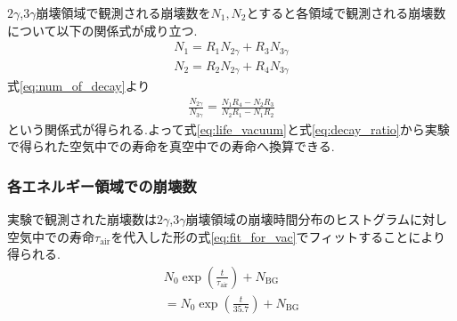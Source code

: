 $2\gamma$,$3\gamma$崩壊領域で観測される崩壊数を$N_1,N_2$とすると各領域で観測される崩壊数について以下の関係式が成り立つ.
\begin{align}
	N_1=R_1N_{2\gamma}+R_3N_{3\gamma} \\
	N_2=R_2N_{2\gamma}+R_4N_{3\gamma}
	\label{eq:num_of_decay}
\end{align}
式\ref{eq:num_of_decay}より
\begin{align}
	\frac{N_{2\gamma}}{N_{3\gamma}}=\frac{N_1R_4-N_2R_3}{N_2R_1-N_1R_2}
	\label{eq:decay_ratio}
\end{align}
という関係式が得られる.よって式\ref{eq:life_vacuum}と式\ref{eq:decay_ratio}から実験で得られた空気中での寿命を真空中での寿命へ換算できる.

\subsubsection{各エネルギー領域での崩壊数}
実験で観測された崩壊数は$2\gamma$,$3\gamma$崩壊領域の崩壊時間分布のヒストグラムに対し空気中での寿命$\tau_\textrm{air}$を代入した形の式\ref{eq:fit_for_vac}でフィットすることにより得られる.
\begin{align}
	N_0\exp\left(\frac{t}{\tau_\textrm{air}}\right)+N_\textrm{BG} \nonumber \\
	=N_0\exp\left(\frac{t}{35.7}\right)+N_\textrm{BG} 
	\label{eq:fit_for_vac}
\end{align}

